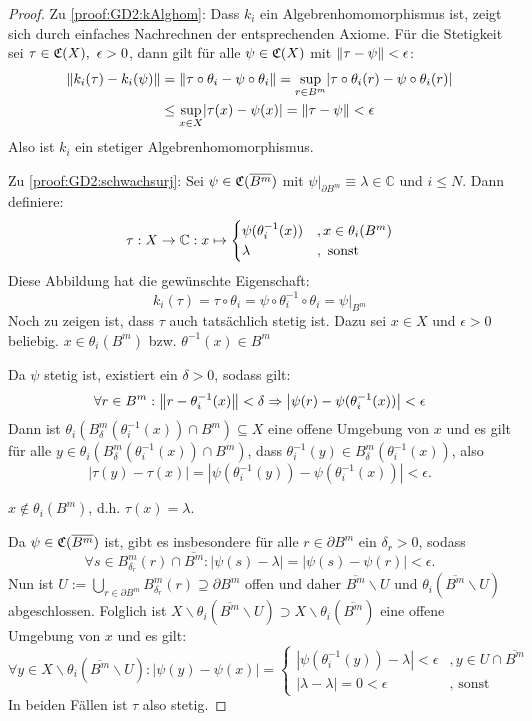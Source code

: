\begin{proof}
Zu \ref{proof:GD2:kAlghom}: Dass $k_i$ ein Algebrenhomomorphismus ist, zeigt sich durch einfaches Nachrechnen der entsprechenden Axiome. Für die Stetigkeit sei $\tau \in \mathfrak{C}(X), ~\epsilon > 0$, dann gilt für alle $\psi \in \mathfrak{C}(X)$ mit $\left\lVert\tau - \psi\right\rVert < \epsilon $:
\begin{align*}
\left\lVert k_i(\tau)-k_i(\psi)\right\rVert &= \left\lVert\tau \circ \theta_i - \psi \circ \theta_i\right\rVert = \underset{r \in B^m}{\sup} |\tau \circ \theta_i(r) - \psi \circ \theta_i(r)| \\
 &\leq \underset{x \in X}{\sup} |\tau (x) - \psi (x)| = \left\lVert\tau- \psi\right\rVert < \epsilon
\end{align*}
Also ist $k_i$ ein stetiger Algebrenhomomorphismus.

Zu \ref{proof:GD2:schwachsurj}: Sei $\psi \in \mathfrak{C}(\overline{B^m} )$ mit $\psi|_{\partial B^m} \equiv \lambda \in \mathbb{C}$ und $i \leq N$. Dann definiere:
\[\tau: X \to \mathbb{C}: x \mapsto \begin{cases} \psi(\theta_i^{-1}(x)) &, x \in \theta_i(B^m) \\ \lambda &, \text{ sonst} \end{cases} \]
Diese Abbildung hat die gewünschte Eigenschaft:
\[k_i(\tau) = \tau \circ \theta_i = \psi \circ \theta_i^{-1} \circ \theta_i = \psi|_{B^m}\]
Noch zu zeigen ist, dass $\tau$ auch tatsächlich stetig ist. Dazu sei $x \in X$ und $\epsilon > 0$ beliebig.
 $x \in \theta_i(B^m)$ bzw. $\theta^{-1}(x) \in B^m$

Da $\psi$ stetig ist, existiert ein $\delta > 0$, sodass gilt: 
	\[\forall r \in B^m: \left\lVert r - \theta_i^{-1}(x)\right\rVert <\delta \Rightarrow \left|\psi(r) - \psi(\theta_i^{-1}(x))\right| < \epsilon \]
Dann ist $\theta_i\left(B_\delta^m(\theta_i^{-1}(x)) \cap B^m\right) \subseteq X$ eine offene Umgebung von $x$ und es gilt für alle $y \in \theta_i\left(B_\delta^m(\theta_i^{-1}(x)) \cap B^m\right)$, dass $\theta_i^{-1}(y) \in B_\delta^m(\theta_i^{-1}(x))$, also
	\[\left|\tau(y) - \tau(x)\right| = \left|\psi(\theta_i^{-1}(y)) - \psi(\theta_i^{-1}(x))\right| < \epsilon.\]

 $x \notin \theta_i(B^m)$, d.h. $\tau(x) = \lambda$.

Da $\psi \in \mathfrak{C}(\overline{B^m})$ ist, gibt es insbesondere für alle $r \in \partial B^m$ ein $\delta_r > 0 $, sodass
	\[\forall s \in B_{\delta_r}^m(r) \cap \overline{B^m}: |\psi(s) - \lambda| = |\psi(s) - \psi(r)| < \epsilon.\]
Nun ist $U := \bigcup_{r \in \partial B^m}B_{\delta_r}^m(r) \supseteq \partial B^m$ offen und daher $\overline{B^m} \backslash U$ und $\theta_i\left(\overline{B^m} \backslash U\right)$ abgeschlossen. Folglich ist $X \backslash \theta_i\left(\overline{B^m} \backslash U\right) \supset X \backslash \theta_i(\overline{B^m})$ eine offene Umgebung von $x$ und es gilt:
	\[\forall y \in X \backslash \theta_i\left(\overline{B^m} \backslash U\right): \left|\psi(y) - \psi(x)\right| = \begin{cases} |\psi(\theta_i^{-1}(y)) - \lambda| < \epsilon &, y \in U \cap \overline{B^m} \\ |\lambda - \lambda| = 0 < \epsilon &, \text{ sonst}\end{cases}\]
In beiden Fällen ist $\tau$ also stetig.


\end{proof}

